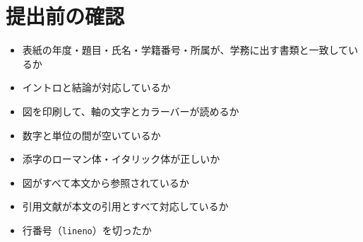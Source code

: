 \section{提出前の確認}
\label{sec:guide_checklist}

\begin{itemize}
  \item 表紙の年度・題目・氏名・学籍番号・所属が、学務に出す書類と一致しているか
  \item イントロと結論が対応しているか
  \item 図を印刷して、軸の文字とカラーバーが読めるか
  \item 数字と単位の間が空いているか
  \item 添字のローマン体・イタリック体が正しいか
  \item 図がすべて本文から参照されているか
  \item 引用文献が本文の引用とすべて対応しているか
  \item 行番号（\texttt{lineno}）を切ったか
\end{itemize}
